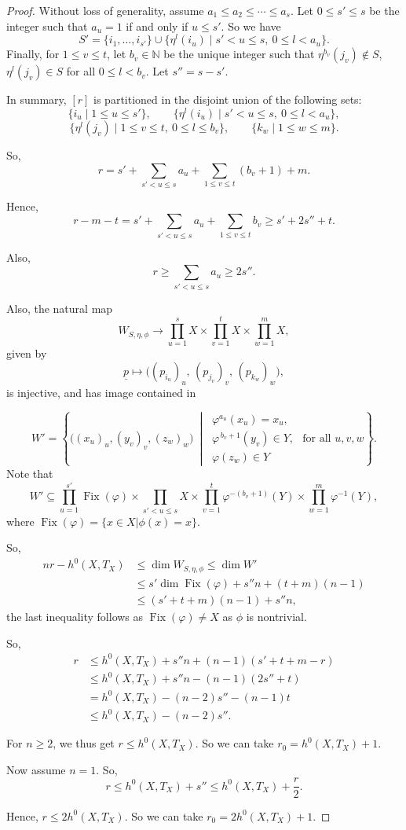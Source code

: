 \documentclass[11pt,letterpaper]{amsart}
\begin{document}
\begin{proof}
Without loss of generality, assume $a_1\le a_2\le\cdots\le a_s$.
Let $0\le s'\le s$ be the integer such that $a_u=1$ if and only if $u\le s'$. So we have 
\[
S'=\{i_1,\ldots,i_{s'}\}\cup
\{\eta^l(i_u)\mid s'<u\le s,\ 0\le l<a_u\}.
\]
Finally, for $1\le v\le t$, let $b_v\in\mathbb N$ be the unique integer such that $\eta^{b_v}(j_v)\notin S$, $\eta^l(j_v)\in S$ for all $0\le l<b_v$. Let $s''=s-s'$.



In summary, $[r]$ is partitioned in the disjoint union of the following sets:
\[
\{i_u\mid 1\le u\le s'\},\qquad
\{\eta^l(i_u)\mid s'<u\le s,\ 0\le l<a_u\},
\]
\[
\{\eta^l(j_v)\mid 1\le v\le t,\ 0\le l\le b_v\},\qquad
\{k_w\mid 1\le w\le m\}.
\]

So,
\[
r=s'+\sum_{s'<u\le s}a_u+\sum_{1\le v\le t}(b_v+1)+m.
\]

Hence,
\[
r-m-t=s'+\sum_{s'<u\le s}a_u+\sum_{1\le v\le t}b_v
\ge s'+2s''+t.
\]

Also,
\[
r\ge \sum_{s'<u\le s}a_u\ge 2s''.
\]

Also, the natural map
\[
W_{S,\eta,\phi}\longrightarrow
\prod_{u=1}^{s}X
\times
\prod_{v=1}^{t}X
\times
\prod_{w=1}^{m}X,
\]
given by
\[
\underline{p}\longmapsto
\bigl((p_{i_u})_u,\,(p_{j_v})_v,\,(p_{k_w})_w\bigr),
\]
is injective, and has image contained in

\[
W'=
\left\{
\bigl((x_u)_u,(y_v)_v,(z_w)_w\bigr)\
\middle|\
\begin{array}{l}
\varphi^{a_u}(x_u)=x_u,\\
\varphi^{\,b_v+1}(y_v)\in Y,\\
\varphi(z_w)\in Y
\end{array}
\text{ for all }u,v,w
\right\}.
\]
Note that
\[
W'\subseteq
\prod_{u=1}^{s'}\operatorname{Fix}(\varphi)
\times
\prod_{s'<u\le s}X
\times
\prod_{v=1}^{t}\varphi^{-(b_v+1)}(Y)
\times
\prod_{w=1}^{m}\varphi^{-1}(Y),
\]
where $\operatorname{Fix}(\varphi)=\{x\in X| \phi(x)=x\}.$

So,
\[
\begin{aligned}
nr-h^0(X,T_X)
&\le \dim W_{S,\eta,\phi}
\le \dim W' \\
&\le s'\dim\operatorname{Fix}(\varphi)
+s''n+(t+m)(n-1) \\
&\le (s'+t+m)(n-1)+s''n,
\end{aligned}
\]
the last inequality follows as $\operatorname{Fix}(\varphi)\neq X$ as $\phi$ is nontrivial.

So,
\[
\begin{aligned}
r
&\le h^0(X,T_X)+s''n+(n-1)(s'+t+m-r) \\
&\le h^0(X,T_X)+s''n-(n-1)(2s''+t) \\
&= h^0(X,T_X)-(n-2)s''-(n-1)t \\
&\le h^0(X,T_X)-(n-2)s''.
\end{aligned}
\]

For $n\ge2$, we thus get $r\le h^0(X,T_X)$. So we can take
$r_0=h^0(X,T_X)+1$.

Now assume $n=1$. So,
\[
r\le h^0(X,T_X)+s''
\le h^0(X,T_X)+\frac{r}{2}.
\]

Hence, $r\le 2h^0(X,T_X).$
So we can take $r_0=2h^0(X,T_X)+1.$
\end{proof}
\end{document}

